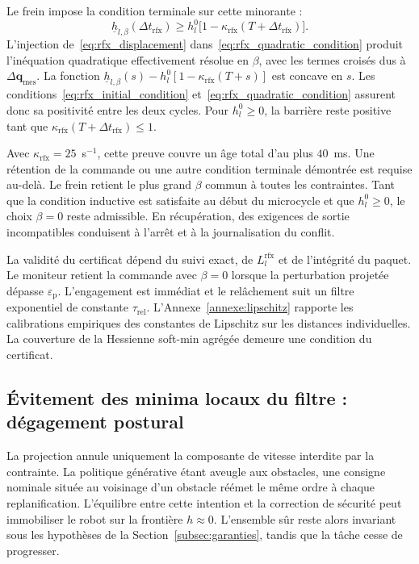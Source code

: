 Le frein impose la condition terminale sur cette minorante :
\begin{equation}\label{eq:rfx_quadratic_condition}
\underline h_{l,\beta}(\Delta t_{\mathrm{rfx}})
\geq h_l^0\bigl[1-\kappa_{\mathrm{rfx}}(T+\Delta t_{\mathrm{rfx}})\bigr].
\end{equation}
L'injection de~\eqref{eq:rfx_displacement} dans~\eqref{eq:rfx_quadratic_condition} produit l'inéquation quadratique effectivement résolue en $\beta$, avec les termes croisés dus à $\Delta\mathbf{q}_{\mathrm{mes}}$. La fonction $\underline h_{l,\beta}(s)-h_l^0[1-\kappa_{\mathrm{rfx}}(T+s)]$ est concave en $s$. Les conditions~\eqref{eq:rfx_initial_condition} et~\eqref{eq:rfx_quadratic_condition} assurent donc sa positivité entre les deux cycles. Pour $h_l^0\geq0$, la barrière reste positive tant que $\kappa_{\mathrm{rfx}}(T+\Delta t_{\mathrm{rfx}})\leq1$.

Avec $\kappa_{\mathrm{rfx}}=25$~s$^{-1}$, cette preuve couvre un âge total d'au plus $40$~ms. Une rétention de la commande ou une autre condition terminale démontrée est requise au-delà. Le frein retient le plus grand $\beta$ commun à toutes les contraintes. Tant que la condition inductive est satisfaite au début du microcycle et que $h_l^0\geq0$, le choix $\beta=0$ reste admissible. En récupération, des exigences de sortie incompatibles conduisent à l'arrêt et à la journalisation du conflit.

La validité du certificat dépend du suivi exact, de $L_l^{\mathrm{rfx}}$ et de l'intégrité du paquet. Le moniteur retient la commande avec $\beta=0$ lorsque la perturbation projetée dépasse $\varepsilon_{\mathrm{p}}$. L'engagement est immédiat et le relâchement suit un filtre exponentiel de constante $\tau_{\mathrm{rel}}$. L'Annexe~\ref{annexe:lipschitz} rapporte les calibrations empiriques des constantes de Lipschitz sur les distances individuelles. La couverture de la Hessienne soft-min agrégée demeure une condition du certificat.

\subsection{Évitement des minima locaux du filtre : dégagement postural}\label{subsec:minima}
La projection annule uniquement la composante de vitesse interdite par la contrainte. La politique générative étant aveugle aux obstacles, une consigne nominale située au voisinage d'un obstacle réémet le même ordre à chaque replanification. L'équilibre entre cette intention et la correction de sécurité peut immobiliser le robot sur la frontière $h \approx 0$. L'ensemble sûr reste alors invariant sous les hypothèses de la Section~\ref{subsec:garanties}, tandis que la tâche cesse de progresser.

